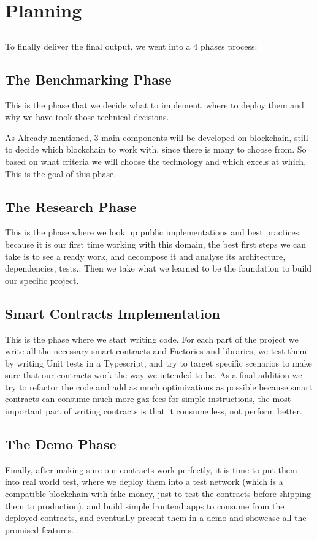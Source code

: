 \chapter{Planning}

\section*{ }
To finally deliver the final output, we went into a 4 phases process:

\section{The Benchmarking Phase}
This is the phase that we decide what to implement, where to deploy them and why we have took those technical decisions. 
\bigskip

As Already mentioned, 3 main components will be developed on blockchain, still to decide which blockchain to work with, since there is many to choose from. So based on what criteria we will choose the technology and which excels at which, This is the goal of this phase.


\section{The Research Phase}
This is the phase where we look up public implementations and best practices. because it is our first time working with this domain, the best first steps we can take is to see a ready work, and decompose it and analyse its architecture, dependencies, tests.. Then we take what we learned to be the foundation to build our specific project.


\section{Smart Contracts Implementation}
This is the phase where we start writing code. For each part of the project we write all the necessary smart contracts and Factories and libraries, we test them by writing Unit tests in a Typescript, and try to target specific scenarios to make sure that our contracts work the way we intended to be. As a final addition we try to refactor the code and add as much optimizations as possible because smart contracts can consume much more gaz fees for simple instructions, the most important part of writing contracts is that it consume less, not perform better.

\section{The Demo Phase}
Finally, after making sure our contracts work perfectly, it is time to put them into real world test, where we deploy them into a test network (which is a compatible blockchain with fake money, just to test the contracts before shipping them to production), and build simple frontend apps to consume from the deployed contracts, and eventually present them in a demo and showcase all the promised features.
\bigskip

